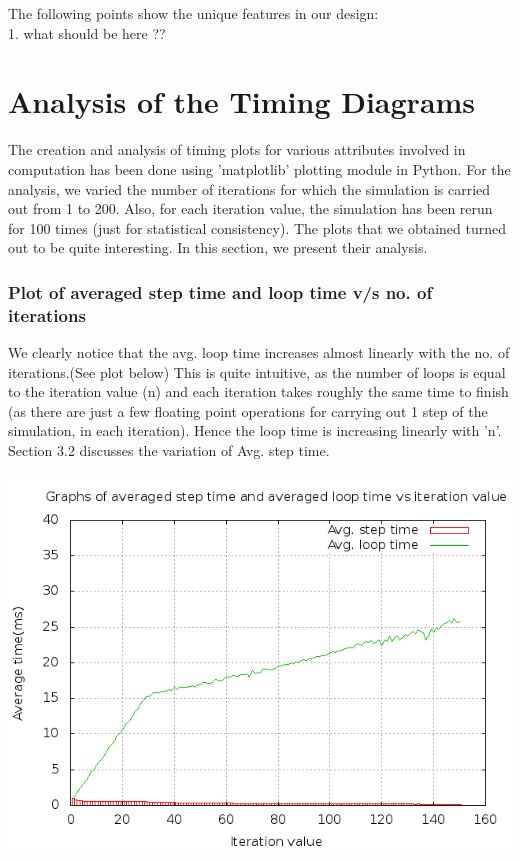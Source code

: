 \documentclass[11pt]{article}
\begin{document}
The following points show the unique features in our design: \\
1. what should be here ?? \\

\section{Analysis of the Timing Diagrams} 

The creation and analysis of timing plots for various attributes involved in computation has been done using 'matplotlib' plotting module\cite{matplotlib} in Python. For the analysis, we varied the number of iterations for which the simulation is carried out from 1 to 200. Also, for each iteration value, the simulation has been rerun for 100 times (just for statistical consistency). The plots that we obtained turned out to be quite interesting. In this section, we present their analysis. \\

\subsubsection{Plot of averaged step time and loop time v/s no. of iterations}
We clearly notice that the avg. loop time increases almost linearly with the no. of iterations.(See plot below) This is quite intuitive, as the number of loops is equal to the iteration value (n) and each iteration takes roughly the same time to finish (as there are just a few floating point operations for carrying out 1 step of the simulation, in each iteration). Hence the loop time is increasing linearly with 'n'. Section 3.2 discusses the variation of Avg. step time.

\begin{center} 
\includegraphics [scale=0.45]{./images/g29_plot01.png} 
\end{center}
\end{document}

